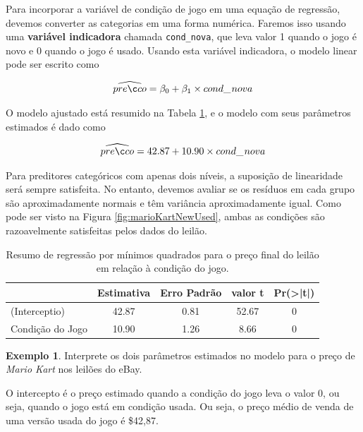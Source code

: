 \documentclass[
]{book}
\theoremstyle{definition}
\theoremstyle{definition}
\newtheorem{example}{Exemplo}[chapter]
\theoremstyle{definition}
\theoremstyle{definition}
\theoremstyle{remark}
\begin{document}
Para incorporar a variável de condição de jogo em uma equação de regressão, devemos converter as categorias em uma forma numérica. Faremos isso usando uma \textbf{variável indicadora} chamada \texttt{cond\_nova}, que leva valor 1 quando o jogo é novo e 0 quando o jogo é usado. Usando esta variável indicadora, o modelo linear pode ser escrito como

\begin{align*}
\widehat{preço} = \beta_0 + \beta_1 \times cond\_\hspace{0.3mm}nova
\end{align*}

O modelo ajustado está resumido na Tabela \ref{tab:marioKartNewUsedRegrSummary}, e o modelo com seus parâmetros estimados é dado como

\begin{align*}
\widehat{preço} = 42.87 + 10.90 \times cond\_\hspace{0.3mm}nova
\end{align*}

Para preditores categóricos com apenas dois níveis, a suposição de linearidade será sempre satisfeita. No entanto, devemos avaliar se os resíduos em cada grupo são aproximadamente normais e têm variância aproximadamente igual. Como pode ser visto na Figura \ref{fig:marioKartNewUsed}, ambas as condições são razoavelmente satisfeitas pelos dados do leilão.

\begin{table}

\caption{\label{tab:marioKartNewUsedRegrSummary}Resumo de regressão por mínimos quadrados para o preço final do leilão em relação à condição do jogo.}
\centering
\begin{tabular}[t]{l|c|c|c|c}
\hline
  & Estimativa & Erro Padrão & valor t & Pr(>|t|)\\
\hline
(Interceptio) & 42.87 & 0.81 & 52.67 & 0\\
\hline
Condição do Jogo & 10.90 & 1.26 & 8.66 & 0\\
\hline
\end{tabular}
\end{table}

\begin{example}
\protect\hypertarget{exm:unnamed-chunk-280}{}{\label{exm:unnamed-chunk-280} }Interprete os dois parâmetros estimados no modelo para o preço de \emph{Mario Kart} nos leilões do eBay.
\end{example}

O intercepto é o preço estimado quando a condição do jogo leva o valor 0, ou seja, quando o jogo está em condição usada. Ou seja, o preço médio de venda de uma versão usada do jogo é \$42,87.
\end{document}
